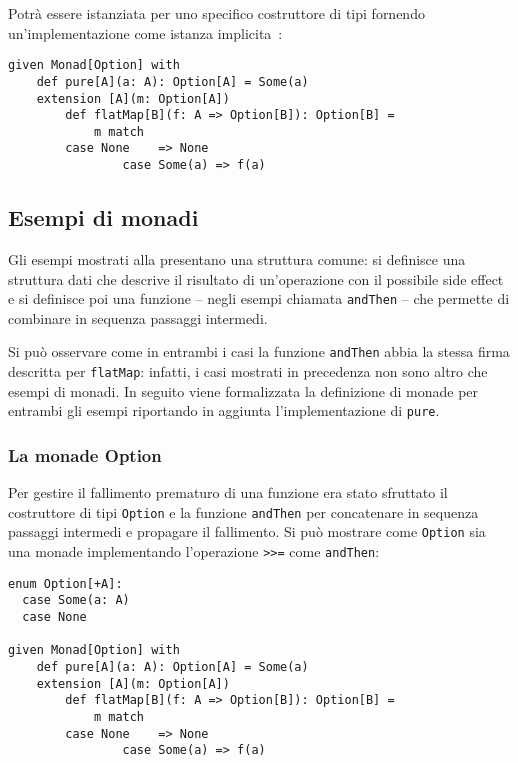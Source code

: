 Potrà essere istanziata per uno specifico costruttore di tipi fornendo un'implementazione come istanza implicita~\cite{cit:scala-book-type-classes}:
\begin{lstlisting}[language=scala3]
given Monad[Option] with
	def pure[A](a: A): Option[A] = Some(a)
	extension [A](m: Option[A]) 
		def flatMap[B](f: A => Option[B]): Option[B] =
			m match
        case None    => None
				case Some(a) => f(a)
\end{lstlisting}

\subsection{Esempi di monadi}
Gli esempi mostrati alla  presentano una struttura comune: si definisce una struttura dati che descrive il risultato di un'operazione con il possibile side effect e si definisce poi una funzione -- negli esempi chiamata \lstinline{andThen} -- che permette di combinare in sequenza passaggi intermedi.

Si può osservare come in entrambi i casi la funzione \lstinline{andThen} abbia la stessa firma descritta per \lstinline{flatMap}: infatti, i casi mostrati in precedenza non sono altro che esempi di monadi. In seguito viene formalizzata la definizione di monade per entrambi gli esempi riportando in aggiunta l'implementazione di \lstinline{pure}.

\subsubsection{La monade Option}
\label{la-monade-optional}
Per gestire il fallimento prematuro di una funzione era stato sfruttato il costruttore di tipi \lstinline{Option} e la funzione \lstinline{andThen} per concatenare in sequenza passaggi intermedi e propagare il fallimento.
Si può mostrare come \lstinline{Option} sia una monade implementando l'operazione \lstinline{>>=} come \lstinline{andThen}:
\begin{lstlisting}[language=scala3]
enum Option[+A]:
  case Some(a: A)
  case None

given Monad[Option] with
	def pure[A](a: A): Option[A] = Some(a)
	extension [A](m: Option[A]) 
		def flatMap[B](f: A => Option[B]): Option[B] =
			m match
        case None    => None
				case Some(a) => f(a)
\end{lstlisting}

